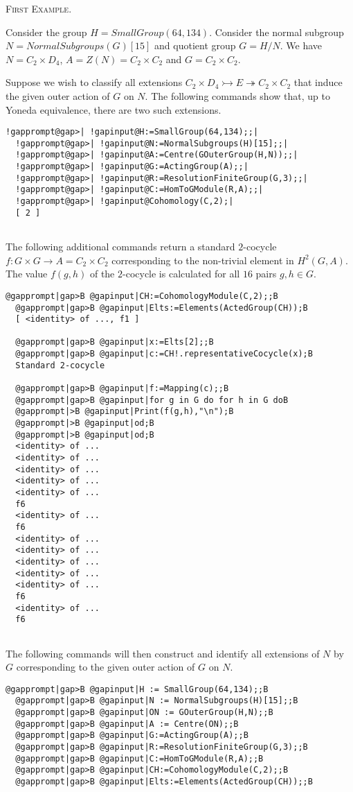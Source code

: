 \documentclass[a4paper,11pt]{report}
\begin{document}
{{\textsc{First Example.} 

 Consider the group $H=SmallGroup(64,134)$. Consider the normal subgroup $N=NormalSubgroups(G)[15]$ and quotient group $G=H/N$. We have $N=C_2\times D_4$, $A=Z(N)=C_2\times C_2$ and $G=C_2\times C_2$. 

 Suppose we wish to classify all extensions $C_2\times D_4 \rightarrowtail E \twoheadrightarrow C_2\times C_2$ that induce the given outer action of $G$ on $N$. The following commands show that, up to Yoneda equivalence, there are two
such extensions. 
\begin{Verbatim}[commandchars=!@|,fontsize=\small,frame=single,label=Example]
  !gapprompt@gap>| !gapinput@H:=SmallGroup(64,134);;|
  !gapprompt@gap>| !gapinput@N:=NormalSubgroups(H)[15];;|
  !gapprompt@gap>| !gapinput@A:=Centre(GOuterGroup(H,N));;|
  !gapprompt@gap>| !gapinput@G:=ActingGroup(A);;|
  !gapprompt@gap>| !gapinput@R:=ResolutionFiniteGroup(G,3);;|
  !gapprompt@gap>| !gapinput@C:=HomToGModule(R,A);;|
  !gapprompt@gap>| !gapinput@Cohomology(C,2);|
  [ 2 ]
  
\end{Verbatim}
 

The following additional commands return a standard $2$-cocycle $f:G\times G\rightarrow A =C_2\times C_2$ corresponding to the non-trivial element in $H^2(G,A)$. The value $f(g,h)$ of the $2$-cocycle is calculated for all $16$ pairs $g,h \in G$. 
\begin{Verbatim}[commandchars=@|B,fontsize=\small,frame=single,label=Example]
  @gapprompt|gap>B @gapinput|CH:=CohomologyModule(C,2);;B
  @gapprompt|gap>B @gapinput|Elts:=Elements(ActedGroup(CH));B
  [ <identity> of ..., f1 ]
  
  @gapprompt|gap>B @gapinput|x:=Elts[2];;B
  @gapprompt|gap>B @gapinput|c:=CH!.representativeCocycle(x);B
  Standard 2-cocycle 
  
  @gapprompt|gap>B @gapinput|f:=Mapping(c);;B
  @gapprompt|gap>B @gapinput|for g in G do for h in G doB
  @gapprompt|>B @gapinput|Print(f(g,h),"\n");B
  @gapprompt|>B @gapinput|od;B
  @gapprompt|>B @gapinput|od;B
  <identity> of ...
  <identity> of ...
  <identity> of ...
  <identity> of ...
  <identity> of ...
  f6
  <identity> of ...
  f6
  <identity> of ...
  <identity> of ...
  <identity> of ...
  <identity> of ...
  <identity> of ...
  f6
  <identity> of ...
  f6
  
\end{Verbatim}
 

The following commands will then construct and identify all extensions of $N$ by $G$ corresponding to the given outer action of $G$ on $N$. 
\begin{Verbatim}[commandchars=@|B,fontsize=\small,frame=single,label=Example]
  @gapprompt|gap>B @gapinput|H := SmallGroup(64,134);;B
  @gapprompt|gap>B @gapinput|N := NormalSubgroups(H)[15];;B
  @gapprompt|gap>B @gapinput|ON := GOuterGroup(H,N);;B
  @gapprompt|gap>B @gapinput|A := Centre(ON);;B
  @gapprompt|gap>B @gapinput|G:=ActingGroup(A);;B
  @gapprompt|gap>B @gapinput|R:=ResolutionFiniteGroup(G,3);;B
  @gapprompt|gap>B @gapinput|C:=HomToGModule(R,A);;B
  @gapprompt|gap>B @gapinput|CH:=CohomologyModule(C,2);;B
  @gapprompt|gap>B @gapinput|Elts:=Elements(ActedGroup(CH));;B
  

\end{Verbatim}}}
\end{document}
